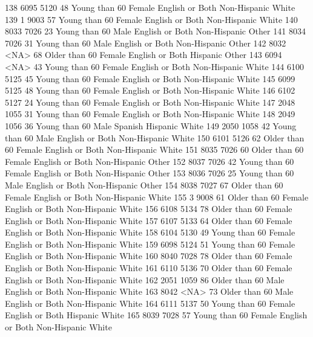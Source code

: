 \documentclass[
  letterpaper,
  DIV=11,
  numbers=noendperiod]{scrreprt}
\newenvironment{Shaded}{\begin{snugshade}}{\end{snugshade}}
\newcommand{\NormalTok}[1]{\textcolor[rgb]{0.00,0.23,0.31}{#1}}
\begin{document}
\begin{Shaded}
\begin{Highlighting}[]
\NormalTok{138 6095 5120  48 Young than 60 Female English or Both Non{-}Hispanic      White}
\NormalTok{139    1 9003  57 Young than 60 Female English or Both Non{-}Hispanic      White}
\NormalTok{140 8033 7026  23 Young than 60   Male English or Both Non{-}Hispanic      Other}
\NormalTok{141 8034 7026  31 Young than 60   Male English or Both Non{-}Hispanic      Other}
\NormalTok{142 8032 \textless{}NA\textgreater{}  68 Older than 60 Female English or Both     Hispanic      Other}
\NormalTok{143 6094 \textless{}NA\textgreater{}  43 Young than 60 Female English or Both Non{-}Hispanic      White}
\NormalTok{144 6100 5125  45 Young than 60 Female English or Both Non{-}Hispanic      White}
\NormalTok{145 6099 5125  48 Young than 60 Female English or Both Non{-}Hispanic      White}
\NormalTok{146 6102 5127  24 Young than 60 Female English or Both Non{-}Hispanic      White}
\NormalTok{147 2048 1055  31 Young than 60 Female English or Both Non{-}Hispanic      White}
\NormalTok{148 2049 1056  36 Young than 60   Male         Spanish     Hispanic      White}
\NormalTok{149 2050 1058  42 Young than 60   Male English or Both Non{-}Hispanic      White}
\NormalTok{150 6101 5126  62 Older than 60 Female English or Both Non{-}Hispanic      White}
\NormalTok{151 8035 7026  60 Older than 60 Female English or Both Non{-}Hispanic      Other}
\NormalTok{152 8037 7026  42 Young than 60 Female English or Both Non{-}Hispanic      Other}
\NormalTok{153 8036 7026  25 Young than 60   Male English or Both Non{-}Hispanic      Other}
\NormalTok{154 8038 7027  67 Older than 60 Female English or Both Non{-}Hispanic      White}
\NormalTok{155    3 9008  61 Older than 60 Female English or Both Non{-}Hispanic      White}
\NormalTok{156 6108 5134  78 Older than 60 Female English or Both Non{-}Hispanic      White}
\NormalTok{157 6107 5133  64 Older than 60 Female English or Both Non{-}Hispanic      White}
\NormalTok{158 6104 5130  49 Young than 60 Female English or Both Non{-}Hispanic      White}
\NormalTok{159 6098 5124  51 Young than 60 Female English or Both Non{-}Hispanic      White}
\NormalTok{160 8040 7028  78 Older than 60 Female English or Both Non{-}Hispanic      White}
\NormalTok{161 6110 5136  70 Older than 60 Female English or Both Non{-}Hispanic      White}
\NormalTok{162 2051 1059  86 Older than 60   Male English or Both Non{-}Hispanic      White}
\NormalTok{163 8042 \textless{}NA\textgreater{}  73 Older than 60   Male English or Both Non{-}Hispanic      White}
\NormalTok{164 6111 5137  50 Young than 60 Female English or Both     Hispanic      White}
\NormalTok{165 8039 7028  57 Young than 60 Female English or Both Non{-}Hispanic      White}

\end{Highlighting}
\end{Shaded}
\end{document}
